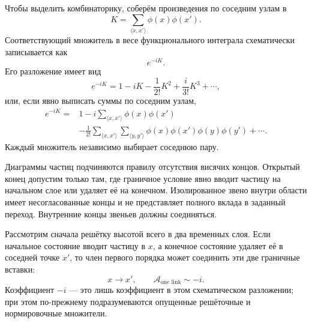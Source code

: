 Чтобы выделить комбинаторику, соберём произведения по соседним узлам в
\begin{equation}
K=\sum_{\langle x,x'\rangle}\phi(x)\phi(x').
\end{equation}
Соответствующий множитель в весе функционального интеграла схематически записывается как
\begin{equation}
e^{-iK}.
\end{equation}
Его разложение имеет вид
\begin{equation}
e^{-iK}
=1-iK-\frac{1}{2!}K^2+\frac{i}{3!}K^3+\cdots,
\end{equation}
или, если явно выписать суммы по соседним узлам,
\begin{align}
e^{-iK}
={}&1
-i\sum_{\langle x,x'\rangle}\phi(x)\phi(x')
\nonumber\\
&-\frac{1}{2!}
\sum_{\langle x,x'\rangle}
\sum_{\langle y,y'\rangle}
\phi(x)\phi(x')\phi(y)\phi(y')
+\cdots .
\end{align}
Каждый множитель независимо выбирает соседнюю пару.

Диаграммы частиц подчиняются правилу отсутствия висячих концов. Открытый конец допустим только там, где граничное условие явно вводит частицу на начальном слое или удаляет её на конечном. Изолированное звено внутри области имеет несогласованные концы и не представляет полного вклада в заданный переход. Внутренние концы звеньев должны соединяться.

Рассмотрим сначала решётку высотой всего в два временных слоя. Если начальное состояние вводит частицу в \(x\), а конечное состояние удаляет её в соседней точке \(x'\), то член первого порядка может соединить эти две граничные вставки:
\begin{equation}
x\longrightarrow x',
\qquad
\mathcal{A}_{\text{one link}}\sim -i.
\end{equation}
Коэффициент \(-i\) — это лишь коэффициент в этом схематическом разложении; при этом по-прежнему подразумеваются опущенные решёточные и нормировочные множители.

\begin{classroomqa}
\end{classroomqa}

